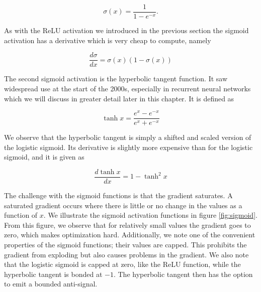 \begin{equation}
\sigma(x) = \frac{1}{1-e^{-x}}.
\end{equation}

\noindent As with the ReLU activation we introduced in the previous section the sigmoid activation has a derivative which is very cheap to compute, namely

\begin{equation}
\frac{d\sigma}{dx} = \sigma(x)(1 - \sigma(x))
\end{equation}

\noindent The second sigmoid activation is the hyperbolic tangent function. It saw widespread use at the start of the 2000s, especially in recurrent neural networks which we will discuss in greater detail later in this chapter. It is defined as 

\begin{equation}
\tanh x = \frac{e^x - e^{-x}}{e^x + e^{-x}}
\end{equation}

\noindent We observe that the hyperbolic tangent is simply a shifted and scaled version of the logistic sigmoid. Its derivative is slightly more expensive than for the logistic sigmoid, and it is given as 

\begin{equation}
\frac{d \tanh x}{d x}  = 1-\tanh^2 x
\end{equation}

\noindent The challenge with the sigmoid functions is that the gradient saturates. A saturated gradient occurs where there is little or no change in the values as a function of $x$. We illustrate the sigmoid activation functions in figure \ref{fig:sigmoid}. From this figure, we observe that for relatively small values the gradient goes to zero, which makes optimization hard. Additionally, we note one of the convenient properties of the sigmoid functions; their values are capped. This prohibits the gradient from exploding but also causes problems in the gradient. We also note that the logistic sigmoid is capped at zero, like the ReLU function, while the hyperbolic tangent is bonded at $-1$. The hyperbolic tangent then has the option to emit a bounded anti-signal.

